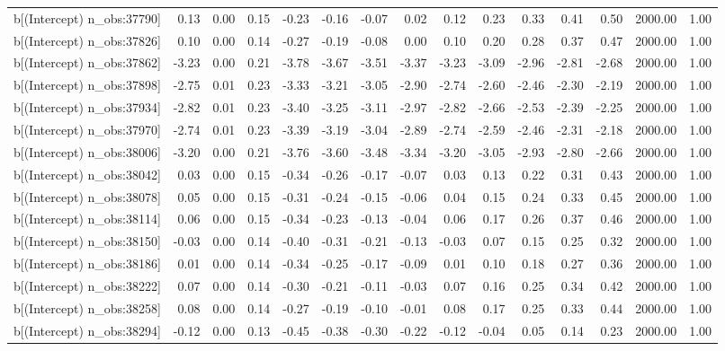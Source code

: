 \begin{table}[ht]
\begin{tabular}{rrrrrrrrrrrrrrr}
  b[(Intercept) n\_obs:37790] & 0.13 & 0.00 & 0.15 & -0.23 & -0.16 & -0.07 & 0.02 & 0.12 & 0.23 & 0.33 & 0.41 & 0.50 & 2000.00 & 1.00 \\ 
  b[(Intercept) n\_obs:37826] & 0.10 & 0.00 & 0.14 & -0.27 & -0.19 & -0.08 & 0.00 & 0.10 & 0.20 & 0.28 & 0.37 & 0.47 & 2000.00 & 1.00 \\ 
  b[(Intercept) n\_obs:37862] & -3.23 & 0.00 & 0.21 & -3.78 & -3.67 & -3.51 & -3.37 & -3.23 & -3.09 & -2.96 & -2.81 & -2.68 & 2000.00 & 1.00 \\ 
  b[(Intercept) n\_obs:37898] & -2.75 & 0.01 & 0.23 & -3.33 & -3.21 & -3.05 & -2.90 & -2.74 & -2.60 & -2.46 & -2.30 & -2.19 & 2000.00 & 1.00 \\ 
  b[(Intercept) n\_obs:37934] & -2.82 & 0.01 & 0.23 & -3.40 & -3.25 & -3.11 & -2.97 & -2.82 & -2.66 & -2.53 & -2.39 & -2.25 & 2000.00 & 1.00 \\ 
  b[(Intercept) n\_obs:37970] & -2.74 & 0.01 & 0.23 & -3.39 & -3.19 & -3.04 & -2.89 & -2.74 & -2.59 & -2.46 & -2.31 & -2.18 & 2000.00 & 1.00 \\ 
  b[(Intercept) n\_obs:38006] & -3.20 & 0.00 & 0.21 & -3.76 & -3.60 & -3.48 & -3.34 & -3.20 & -3.05 & -2.93 & -2.80 & -2.66 & 2000.00 & 1.00 \\ 
  b[(Intercept) n\_obs:38042] & 0.03 & 0.00 & 0.15 & -0.34 & -0.26 & -0.17 & -0.07 & 0.03 & 0.13 & 0.22 & 0.31 & 0.43 & 2000.00 & 1.00 \\ 
  b[(Intercept) n\_obs:38078] & 0.05 & 0.00 & 0.15 & -0.31 & -0.24 & -0.15 & -0.06 & 0.04 & 0.15 & 0.24 & 0.33 & 0.45 & 2000.00 & 1.00 \\ 
  b[(Intercept) n\_obs:38114] & 0.06 & 0.00 & 0.15 & -0.34 & -0.23 & -0.13 & -0.04 & 0.06 & 0.17 & 0.26 & 0.37 & 0.46 & 2000.00 & 1.00 \\ 
  b[(Intercept) n\_obs:38150] & -0.03 & 0.00 & 0.14 & -0.40 & -0.31 & -0.21 & -0.13 & -0.03 & 0.07 & 0.15 & 0.25 & 0.32 & 2000.00 & 1.00 \\ 
  b[(Intercept) n\_obs:38186] & 0.01 & 0.00 & 0.14 & -0.34 & -0.25 & -0.17 & -0.09 & 0.01 & 0.10 & 0.18 & 0.27 & 0.36 & 2000.00 & 1.00 \\ 
  b[(Intercept) n\_obs:38222] & 0.07 & 0.00 & 0.14 & -0.30 & -0.21 & -0.11 & -0.03 & 0.07 & 0.16 & 0.25 & 0.34 & 0.42 & 2000.00 & 1.00 \\ 
  b[(Intercept) n\_obs:38258] & 0.08 & 0.00 & 0.14 & -0.27 & -0.19 & -0.10 & -0.01 & 0.08 & 0.17 & 0.25 & 0.33 & 0.44 & 2000.00 & 1.00 \\ 
  b[(Intercept) n\_obs:38294] & -0.12 & 0.00 & 0.13 & -0.45 & -0.38 & -0.30 & -0.22 & -0.12 & -0.04 & 0.05 & 0.14 & 0.23 & 2000.00 & 1.00 \\ 

\end{tabular}
\end{table}
